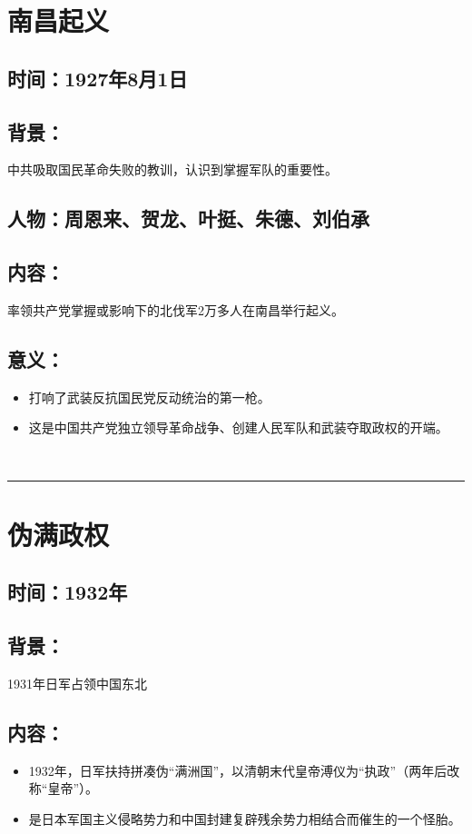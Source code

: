 \documentclass{article}
\begin{document}
\section*{南昌起义}
\subsection*{时间：1927年8月1日}
\subsection*{背景：}
\noindent 中共吸取国民革命失败的教训，认识到掌握军队的重要性。
\subsection*{人物：周恩来、贺龙、叶挺、朱德、刘伯承}
\subsection*{内容：}
\noindent 率领共产党掌握或影响下的北伐军2万多人在南昌举行起义。
\subsection*{意义：}
\begin{itemize}
    \item 打响了武装反抗国民党反动统治的第一枪。
    \item 这是中国共产党独立领导革命战争、创建人民军队和武装夺取政权的开端。
\end{itemize}
\ \hrule

\section*{伪满政权}
\subsection*{时间：1932年}
\subsection*{背景：}
\noindent 1931年日军占领中国东北
\subsection*{内容：}
\begin{itemize}
    \item 
    1932年，日军扶持拼凑伪“满洲国”，以清朝末代皇帝溥仪为“执政”（两年后改称“皇帝”）。
    \item 是日本军国主义侵略势力和中国封建复辟残余势力相结合而催生的一个怪胎。
    
\end{itemize}
\end{document}
